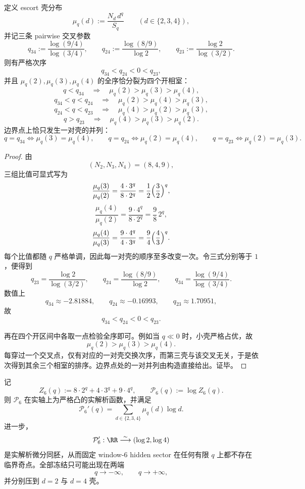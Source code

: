 \begin{theorem}\label{thm:conclusion-window6-shell-escort-fourchamber-phase-diagram}
定义 escort 壳分布
\[
\mu_q(d):=\frac{N_d\,d^q}{S_q}
\qquad
(d\in\{2,3,4\}),
\]
并记三条 pairwise 交叉参数
\[
q_{34}:=\frac{\log(9/4)}{\log(3/4)},
\qquad
q_{24}:=\frac{\log(8/9)}{\log 2},
\qquad
q_{23}:=\frac{\log 2}{\log(3/2)}.
\]
则有严格次序
\[
q_{34}<q_{24}<0<q_{23},
\]
并且 \(\mu_q(2),\mu_q(3),\mu_q(4)\) 的全序恰分裂为四个开相室：
\[
q<q_{34}
\quad\Longrightarrow\quad
\mu_q(2)>\mu_q(3)>\mu_q(4),
\]
\[
q_{34}<q<q_{24}
\quad\Longrightarrow\quad
\mu_q(2)>\mu_q(4)>\mu_q(3),
\]
\[
q_{24}<q<q_{23}
\quad\Longrightarrow\quad
\mu_q(4)>\mu_q(2)>\mu_q(3),
\]
\[
q>q_{23}
\quad\Longrightarrow\quad
\mu_q(4)>\mu_q(3)>\mu_q(2).
\]
边界点上恰只发生一对壳的并列：
\[
q=q_{34}\iff \mu_q(3)=\mu_q(4),
\qquad
q=q_{24}\iff \mu_q(2)=\mu_q(4),
\qquad
q=q_{23}\iff \mu_q(2)=\mu_q(3).
\]
\end{theorem}

\begin{proof}
由
\[
(N_2,N_3,N_4)=(8,4,9),
\]
三组比值可显式写为
\[
\frac{\mu_q(3)}{\mu_q(2)}
=
\frac{4\cdot 3^q}{8\cdot 2^q}
=
\frac12\Bigl(\frac32\Bigr)^q,
\]
\[
\frac{\mu_q(4)}{\mu_q(2)}
=
\frac{9\cdot 4^q}{8\cdot 2^q}
=
\frac98\,2^q,
\]
\[
\frac{\mu_q(4)}{\mu_q(3)}
=
\frac{9\cdot 4^q}{4\cdot 3^q}
=
\frac94\Bigl(\frac43\Bigr)^q.
\]
每个比值都随 \(q\) 严格单调，因此每一对壳的顺序至多改变一次。令三式分别等于 \(1\)，便得到
\[
q_{23}=\frac{\log 2}{\log(3/2)},
\qquad
q_{24}=\frac{\log(8/9)}{\log 2},
\qquad
q_{34}=\frac{\log(9/4)}{\log(3/4)}.
\]
数值上
\[
q_{34}\approx -2.81884,
\qquad
q_{24}\approx -0.16993,
\qquad
q_{23}\approx 1.70951,
\]
故
\[
q_{34}<q_{24}<0<q_{23}.
\]

再在四个开区间中各取一点检验全序即可。例如当 \(q\ll 0\) 时，小壳严格占优，故
\[
\mu_q(2)>\mu_q(3)>\mu_q(4).
\]
每穿过一个交叉点，仅有对应的一对壳交换次序，而第三壳与该交叉无关，于是依次得到其余三个相室的排序。边界点处的一对并列由构造直接给出。证毕。
\end{proof}

\begin{corollary}\label{cor:conclusion-window6-fixedwindow-hidden-analytic-diffeomorphism}
记
\[
Z_6(q):=8\cdot 2^q+4\cdot 3^q+9\cdot 4^q,
\qquad
\mathcal P_6(q):=\log Z_6(q).
\]
则 \(\mathcal P_6\) 在实轴上为严格凸的实解析函数，并满足
\[
\mathcal P_6'(q)=\sum_{d\in\{2,3,4\}}\mu_q(d)\log d.
\]
进一步，
\[
\mathcal P_6':\RR\overset{\sim}{\longrightarrow}(\log 2,\log 4)
\]
是实解析微分同胚，从而固定 window-\(6\) hidden sector 在任何有限 \(q\) 上都不存在临界奇点。全部冻结只可能出现在两端
\[
q\to-\infty,\qquad q\to+\infty,
\]
并分别压到 \(d=2\) 与 \(d=4\) 壳。
\end{corollary}

